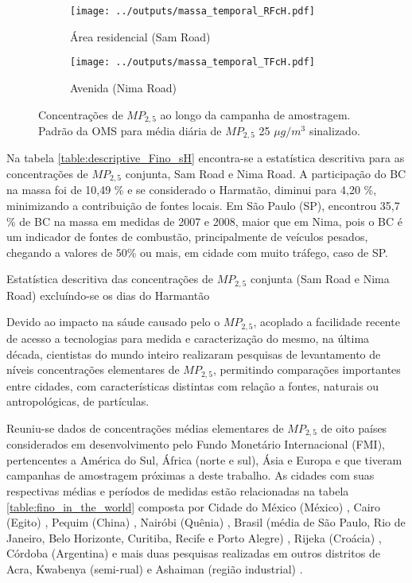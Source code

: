 \begin{figure}[H]
  \centering
  \begin{subfigure}[b]{0.45\textwidth}
    \texttt{[image: ../outputs/massa\_temporal\_RFcH.pdf]}
    \caption{Área residencial (Sam Road)}
  \end{subfigure}%
  \begin{subfigure}[b]{0.45\textwidth}
    \texttt{[image: ../outputs/massa\_temporal\_TFcH.pdf]}
    \caption{Avenida (Nima Road)}
  \end{subfigure}
  \caption{Concentrações de $MP_{2,5}$ ao longo da campanha de amostragem. 
           Padrão da OMS para média diária de $MP_{2,5}$ 25 $\mu g/m^3$ sinalizado.
           \label{fig:massa_temporal_mp2.5}}
\end{figure}

Na tabela \ref{table:descriptive_Fino_sH} encontra-se a estatística 
descritiva para as concentrações de $MP_{2,5}$ conjunta, Sam Road e Nima Road. 
A participação do BC na massa foi de 10,49 \% e se considerado 
o Harmatão, diminui para 4,20 \%, minimizando a contribuição de fontes locais.
Em São Paulo (SP), \citet{andrade2012} encontrou 35,7 \% de BC na massa em medidas
de 2007 e 2008, maior que em Nima, pois o BC é um indicador de fontes de 
combustão, principalmente de veículos pesados, chegando a valores de 50\% ou 
mais, em cidade com muito tráfego, caso de SP.

\begin{table}[H]
  \centering
    
  \caption{Estatística descritiva das concentrações de $MP_{2,5}$ conjunta 
           (Sam Road e Nima Road) excluíndo-se os dias do Harmantão
            \label{table:descriptive_Fino_sH}}
\end{table}

Devido ao impacto na sáude causado pelo o $MP_{2,5}$, acoplado a facilidade 
recente de acesso a tecnologias para medida e caracterização do mesmo, 
na última década, cientistas do mundo inteiro realizaram pesquisas de 
levantamento de níveis concentrações elementares de $MP_{2,5}$, permitindo
comparações importantes entre cidades, com características distintas com 
relação a fontes, naturais ou antropológicas, de partículas.

Reuniu-se dados de concentrações médias elementares de $MP_{2,5}$ de oito 
países considerados em desenvolvimento pelo Fundo Monetário Internacional (FMI),
pertencentes a América do Sul, África (norte e sul), Ásia e Europa e que tiveram
campanhas de amostragem próximas a deste trabalho. As cidades
com suas respectivas médias e períodos de medidas estão relacionadas na 
tabela \ref{table:fino_in_the_world} composta por  
Cidade do México (México) \citep{diaz2014},
Cairo (Egito) \citep{boman2013},
Pequim (China) \citep{yang2011},
Nairóbi (Quênia)  \citep{gaita2014},
Brasil (média de São Paulo, Rio de Janeiro, Belo Horizonte, Curitiba, 
Recife e Porto Alegre)  \citep{andrade2012urban},
Rijeka (Croácia) \citep{ivovsevic2015}, 
Córdoba (Argentina) \citep{achad2014} e mais duas pesquisas realizadas em 
outros distritos de Acra, Kwabenya (semi-rual) \citep{aboh2009} e Ashaiman
(região industrial) \citep{ofosu2012}. 

